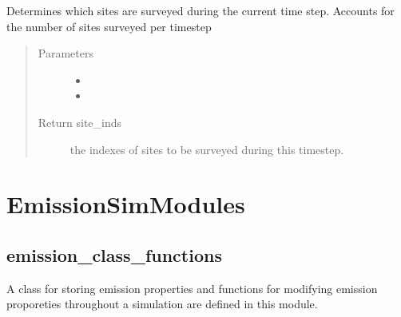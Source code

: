 \documentclass[letterpaper,10pt,english]{sphinxmanual}
\begin{document}
\begin{fulllineitems}
\begin{fulllineitems}
\end{fulllineitems}


\begin{fulllineitems}
\label{\detokenize{index:feast.DetectionModules.site_survey.SiteSurvey.sites_surveyed}}
Determines which sites are surveyed during the current time step.
Accounts for the number of sites surveyed per timestep
\begin{quote}\begin{description}
\item[{Parameters}] \leavevmode\begin{itemize}
\item {} 
 \textendash{} 

\item {} 
 \textendash{} 

\end{itemize}

\item[{Return site\_inds}] \leavevmode
the indexes of sites to be surveyed during this timestep.

\end{description}\end{quote}

\end{fulllineitems}


\end{fulllineitems}



\section{EmissionSimModules}
\label{\detokenize{index:emissionsimmodules}}

\subsection{emission\_class\_functions}
\label{\detokenize{index:module-feast.EmissionSimModules.emission_class_functions}}\label{\detokenize{index:emission-class-functions}}
A class for storing emission properties and functions for modifying emission proporeties throughout a simulation are
defined in this module.
\end{document}
